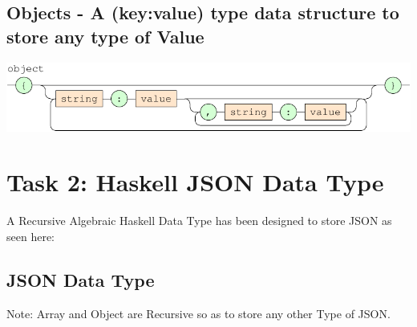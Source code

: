 \documentclass[a4paper]{article}
\begin{document}
\subsection*{Objects - A (key:value) type data structure to store any type of Value }

{\centering

   \includegraphics[scale=0.9]{EBNF/object}

}

\newpage


\section{Task 2: Haskell JSON Data Type}

A Recursive Algebraic Haskell Data Type has been designed to store JSON as seen here:


\subsection*{JSON Data Type}

Note: Array and Object are Recursive so as to store any other Type of JSON.


\end{document}
